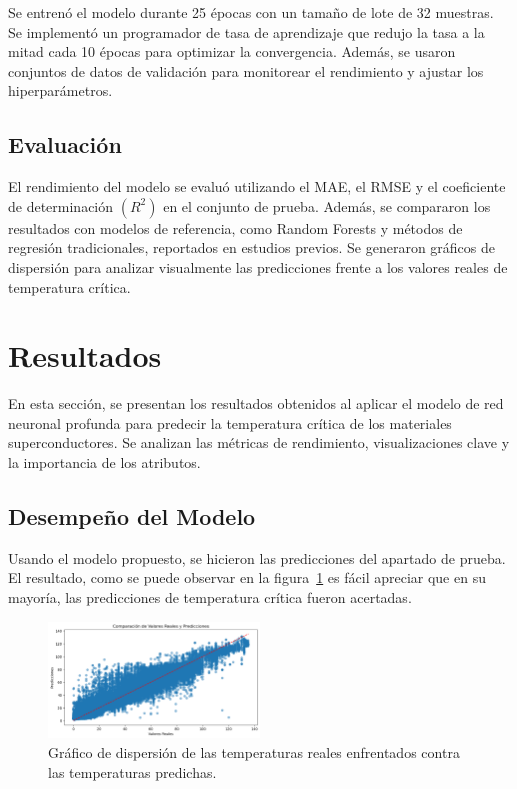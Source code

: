 \documentclass[conference]{IEEEtran} %
\begin{document}
Se entrenó el modelo durante 25 épocas con un tamaño de lote de 32 
muestras. Se implementó un programador de tasa de aprendizaje que 
redujo la tasa a la mitad cada 10 épocas para optimizar la 
convergencia. Además, se usaron conjuntos de datos de validación 
para monitorear el rendimiento y ajustar los hiperparámetros.

\subsection{Evaluación}

El rendimiento del modelo se evaluó utilizando el MAE, el RMSE y 
el coeficiente de determinación $(R^2)$ en el conjunto de prueba. 
Además, se compararon los resultados con modelos de referencia, 
como Random Forests y métodos de regresión tradicionales, 
reportados en estudios previos. Se generaron gráficos de dispersión 
para analizar visualmente las predicciones frente a los valores 
reales de temperatura crítica.

\section{Resultados}

En esta sección, se presentan los resultados obtenidos al aplicar 
el modelo de red neuronal profunda para predecir la temperatura 
crítica de los materiales superconductores. Se analizan las 
métricas de rendimiento, visualizaciones clave y la importancia 
de los atributos.

\subsection{Desempeño del Modelo}

Usando el modelo propuesto, se hicieron las predicciones
del apartado de prueba. El resultado, como se puede observar en
la figura~\ref{fig:Entrenamiento} es fácil apreciar que en su mayoría,
las predicciones de temperatura crítica fueron acertadas.

\begin{figure}[!h]
    \centering
    \includegraphics[width=0.5\textwidth]{Entrenamiento.png}
    \caption{Gráfico de dispersión de las temperaturas reales enfrentados contra las temperaturas predichas.}
    \label{fig:Entrenamiento}
\end{figure}
\end{document}
